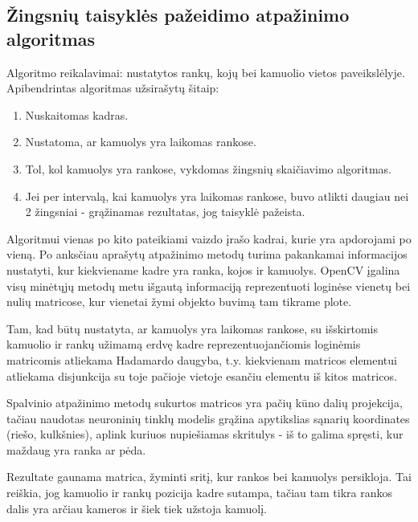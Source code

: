 \documentclass{VUMIFPSbakalaurinis}
\begin{document}
\subsection{Žingsnių taisyklės pažeidimo atpažinimo algoritmas}

Algoritmo reikalavimai: nustatytos rankų, kojų bei kamuolio vietos paveikslėlyje. Apibendrintas algoritmas užsirašytų šitaip: 

\begin{enumerate}
	\item Nuskaitomas kadras.
	\item Nustatoma, ar kamuolys yra laikomas rankose.
	\item Tol, kol kamuolys yra rankose, vykdomas žingsnių skaičiavimo algoritmas.
	\item Jei per intervalą, kai kamuolys yra laikomas rankose, buvo atlikti daugiau nei 2 žingsniai - grąžinamas rezultatas, jog taisyklė pažeista.
\end{enumerate}

Algoritmui vienas po kito pateikiami vaizdo įrašo kadrai, kurie yra apdorojami po vieną. Po anksčiau aprašytų atpažinimo metodų turima pakankamai informacijos nustatyti, kur kiekviename kadre yra ranka, kojos ir kamuolys. OpenCV įgalina visų minėtųjų metodų metu išgautą informaciją reprezentuoti loginėse vienetų bei nulių matricose, kur vienetai žymi objekto buvimą tam tikrame plote. 

Tam, kad būtų nustatyta, ar kamuolys yra laikomas rankose, su išskirtomis kamuolio ir rankų užimamą erdvę kadre reprezentuojančiomis loginėmis matricomis atliekama Hadamardo daugyba, t.y. kiekvienam matricos elementui atliekama disjunkcija su toje pačioje vietoje esančiu elementu iš kitos matricos.

Spalvinio atpažinimo metodų sukurtos matricos yra pačių kūno dalių projekcija, tačiau naudotas neuroninių tinklų modelis grąžina apytikslias sąnarių koordinates (riešo, kulkšnies), aplink kuriuos nupiešiamas skritulys - iš to galima spręsti, kur maždaug yra ranka ar pėda.  

Rezultate gaunama matrica, žyminti sritį, kur rankos bei kamuolys persikloja. Tai reiškia, jog kamuolio ir rankų pozicija kadre sutampa, tačiau tam tikra rankos dalis yra arčiau kameros ir šiek tiek užstoja kamuolį. 
\end{document}
